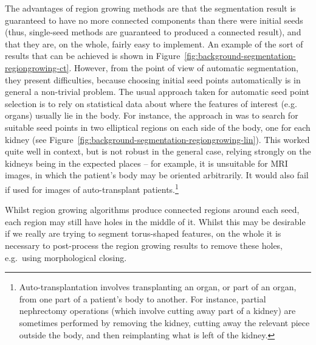 
The advantages of region growing methods are that the segmentation result is guaranteed to have no more connected components than there were initial seeds (thus, single-seed methods are guaranteed to produced a connected result), and that they are, on the whole, fairly easy to implement. An example of the sort of results that can be achieved is shown in Figure~\ref{fig:background-segmentation-regiongrowing-ct}. However, from the point of view of automatic segmentation, they present difficulties, because choosing initial seed points automatically is in general a non-trivial problem. The usual approach taken for automatic seed point selection is to rely on statistical data about where the features of interest (e.g. organs) usually lie in the body. For instance, the approach in \cite{lin06} was to search for suitable seed points in two elliptical regions on each side of the body, one for each kidney (see Figure~\ref{fig:background-segmentation-regiongrowing-lin}). This worked quite well in context, but is not robust in the general case, relying strongly on the kidneys being in the expected places -- for example, it is unsuitable for MRI images, in which the patient's body may be oriented arbitrarily. It would also fail if used for images of auto-transplant patients.\footnote{Auto-transplantation involves transplanting an organ, or part of an organ, from one part of a patient's body to another. For instance, partial nephrectomy operations (which involve cutting away part of a kidney) are sometimes performed by removing the kidney, cutting away the relevant piece outside the body, and then reimplanting what is left of the kidney.}

Whilst region growing algorithms produce connected regions around each seed, each region may still have holes in the middle of it. Whilst this may be desirable if we really are trying to segment torus-shaped features, on the whole it is necessary to post-process the region growing results to remove these holes, e.g.~using morphological closing.


